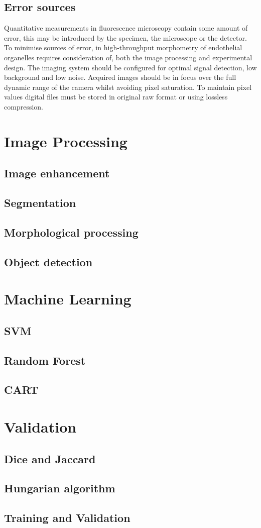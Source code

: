 \subsection{Error sources}
Quantitative measurements in fluorescence microscopy contain some amount of error, this may be introduced by the specimen, the microscope or the detector. To minimise sources of error, in high-throughput morphometry of endothelial organelles requires consideration of, both the image processing and experimental design. The imaging system should be configured for optimal signal detection, low background and low noise. Acquired images should be in focus over the full dynamic range of the camera whilst avoiding pixel saturation. To maintain pixel values digital files must be stored in original raw format or using lossless compression.


\section{Image Processing}
\subsection{Image enhancement}
\subsection{Segmentation}
\subsection{Morphological processing}
\subsection{Object detection}

\section{Machine Learning}
\subsection{SVM}
\subsection{Random Forest}
\subsection{CART}

\section{Validation}
\subsection{Dice and Jaccard}
\subsection{Hungarian algorithm}
\subsection{Training and Validation}
